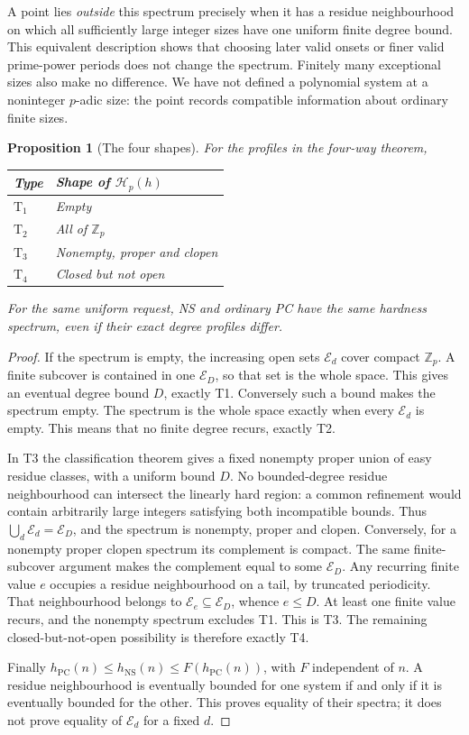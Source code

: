 \documentclass[11pt,a4paper,oneside,openany]{book}
\newtheorem{proposition}[theorem]{Proposition}
\theoremstyle{definition}\newtheorem{definition}[theorem]{Definition}
\theoremstyle{remark}\newtheorem{remark}[theorem]{Remark}
\newcommand{\NS}{\mathrm{NS}}\newcommand{\PC}{\mathrm{PC}}
\numberwithin{equation}{chapter}
\begin{document}
A point lies \emph{outside} this spectrum precisely when it has a
residue neighbourhood on which all sufficiently large integer sizes
have one uniform finite degree bound. This equivalent description
shows that choosing later valid onsets or finer valid prime-power
periods does not change the spectrum. Finitely many exceptional sizes
also make no difference. We have not defined a polynomial system at
a noninteger $p$-adic size: the point records compatible information
about ordinary finite sizes.

\begin{proposition}[The four shapes]\label{tx:prop:topological-spectrum}
For the profiles in the four-way theorem,
\begin{center}
\begin{tabular}{@{}ll@{}}
\toprule
Type & Shape of $\mathcal H_p(h)$\\
\midrule
$\mathrm T_1$ & Empty\\
$\mathrm T_2$ & All of $\mathbb Z_p$\\
$\mathrm T_3$ & Nonempty, proper and clopen\\
$\mathrm T_4$ & Closed but not open\\
\bottomrule
\end{tabular}
\end{center}
For the same uniform request, NS and ordinary PC have the same
hardness spectrum, even if their exact degree profiles differ.
\end{proposition}
\begin{proof}
If the spectrum is empty, the increasing open sets $\mathcal E_d$
cover compact $\mathbb Z_p$. A finite subcover is contained in one
$\mathcal E_D$, so that set is the whole space. This gives an eventual
degree bound $D$, exactly T1. Conversely such a bound makes the
spectrum empty. The spectrum is the whole space exactly when every
$\mathcal E_d$ is empty. This means that no finite degree recurs,
exactly T2.

In T3 the classification theorem gives a fixed nonempty proper union
of easy residue classes, with a uniform bound $D$. No bounded-degree
residue neighbourhood can intersect the linearly hard region: a common
refinement would contain arbitrarily large integers satisfying both
incompatible bounds. Thus $\bigcup_d\mathcal E_d=\mathcal E_D$,
and the spectrum is nonempty, proper and clopen.
Conversely, for a nonempty proper clopen spectrum its complement is
compact. The same finite-subcover argument makes the complement equal
to some $\mathcal E_D$. Any recurring finite value $e$ occupies a
residue neighbourhood on a tail, by truncated periodicity. That
neighbourhood belongs to $\mathcal E_e\subseteq\mathcal E_D$, whence
$e\le D$. At least one finite value recurs, and the nonempty spectrum
excludes T1. This is T3. The remaining closed-but-not-open possibility
is therefore exactly T4.

Finally $h_{\PC}(n)\le h_{\NS}(n)\le F(h_{\PC}(n))$, with $F$
independent of $n$. A residue neighbourhood is eventually bounded for
one system if and only if it is eventually bounded for the other.
This proves equality of their spectra; it does not prove equality of
$\mathcal E_d$ for a fixed $d$.
\end{proof}
\end{document}
